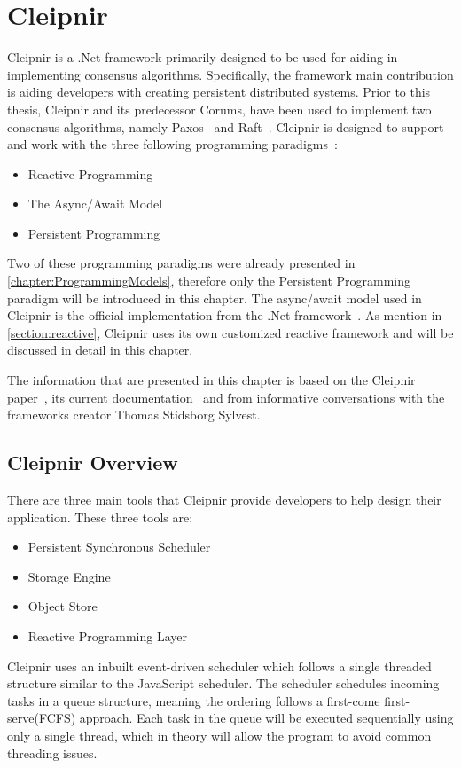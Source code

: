 \chapter{Cleipnir}
\label{chapter:Cleipnir}

Cleipnir is a .Net framework primarily designed to be used for aiding in implementing consensus algorithms. Specifically, the framework main contribution is aiding developers with creating persistent distributed systems. Prior to this thesis, Cleipnir and its predecessor Corums, have been used to implement two consensus algorithms, namely Paxos~\cite[p.~32-38]{PAPER:EivindPaper} and Raft~\cite[p.~13-15]{PAPER:PaxosCleipnir}. 
Cleipnir is designed to support and work with the three following programming paradigms~\cite[p.~5]{PAPER:PaxosCleipnir}: 
\begin{itemize}
\item {Reactive Programming}
\item {The Async/Await Model}
\item {Persistent Programming}
\end{itemize}

Two of these programming paradigms were already presented in \autoref{chapter:ProgrammingModels}, therefore only the Persistent Programming paradigm will be introduced in this chapter. The async/await model used in Cleipnir is the official implementation from the .Net framework~\cite{DOC:AsyncAwait}. As mention in \autoref{section:reactive}, Cleipnir uses its own customized reactive framework and will be discussed in detail in this chapter.

The information that are presented in this chapter is based on the Cleipnir paper~\cite{PAPER:PaxosCleipnir}, its current documentation~\cite{DOC:Cleipnir} and from informative conversations with the frameworks creator Thomas Stidsborg Sylvest.

\section{Cleipnir Overview}
\label{section:CleipnirOv}
There are three main tools that Cleipnir provide developers to help design their application.
These three tools are:
\begin{itemize}
	\item{Persistent Synchronous Scheduler}
	\item{Storage Engine}
	\item{Object Store}
	\item{Reactive Programming Layer}
\end{itemize}
Cleipnir uses an inbuilt event-driven scheduler which follows a single threaded structure similar to the JavaScript scheduler\cites[p.~7]{PAPER:PaxosCleipnir}{WEB:CleipnirScheduler}. The scheduler schedules incoming tasks in a queue structure, meaning the ordering follows a first-come first-serve(FCFS)\cite{WEB:FIFO} approach. Each task in the queue will be executed sequentially using only a single thread, which in theory will allow the program to avoid common threading issues\cite[p.~7]{PAPER:PaxosCleipnir}. %

